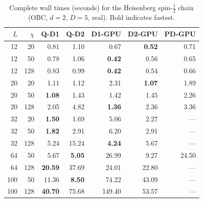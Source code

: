 \documentclass[preprint,12pt]{elsarticle}
\begin{document}
\begin{table}[h]
\centering
\caption{Complete wall times (seconds) for the Heisenberg spin-$\frac{1}{2}$ chain (OBC, $d = 2$, $D = 5$, real). Bold indicates fastest.}
\label{tab:full_heisenberg}
\begin{tabular}{rr|rr|rrr}
\toprule
$L$ & $\chi$ & Q-D1 & Q-D2 & D1-GPU & D2-GPU & PD-GPU \\
\midrule
12 & 20  & 0.81 & 1.10 & 0.67 & \textbf{0.52} & 0.71 \\
12 & 50  & 0.78 & 1.06 & \textbf{0.42} & 0.56 & 0.65 \\
12 & 128 & 0.83 & 0.99 & \textbf{0.42} & 0.54 & 0.66 \\
20 & 20  & 1.11 & 1.12 & 2.31 & \textbf{1.07} & 1.89 \\
20 & 50  & \textbf{1.08} & 1.43 & 1.42 & 1.45 & 2.26 \\
20 & 128 & 2.05 & 4.82 & \textbf{1.36} & 2.36 & 3.36 \\
32 & 20  & \textbf{1.50} & 1.69 & 5.06 & 2.27 & --- \\
32 & 50  & \textbf{1.82} & 2.91 & 6.20 & 2.91 & --- \\
32 & 128 & 5.24 & 15.24 & \textbf{4.24} & 5.67 & --- \\
64 & 50  & 5.67 & \textbf{5.05} & 26.99 & 9.27 & 24.50 \\
64 & 128 & \textbf{20.59} & 37.69 & 24.01 & 22.80 & --- \\
100 & 50  & 11.36 & \textbf{8.50} & 74.22 & 43.09 & --- \\
100 & 128 & \textbf{40.70} & 75.68 & 149.40 & 53.57 & --- \\
\bottomrule
\end{tabular}
\end{table}
\end{document}
